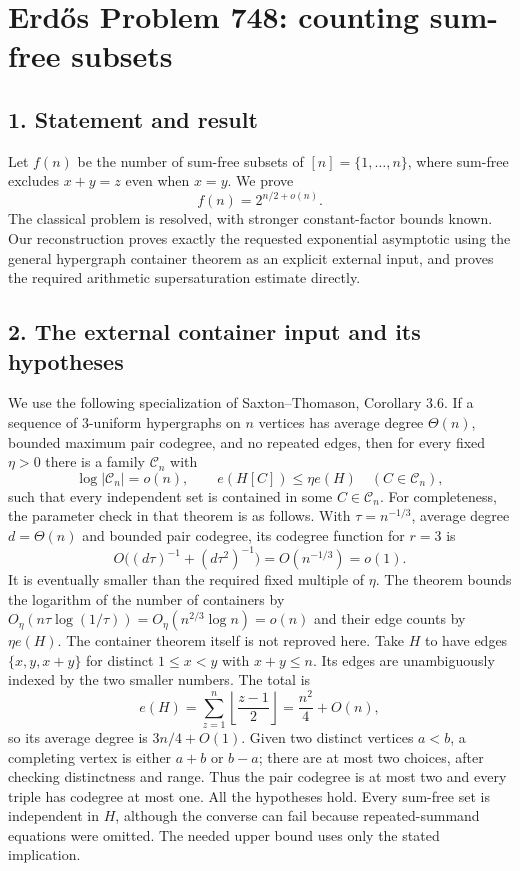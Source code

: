 \section*{Erd\H{o}s Problem 748: counting sum-free subsets}
\subsection*{1. Statement and result}
Let $f(n)$ be the number of sum-free subsets of $[n]=\{1,\ldots,n\}$, where sum-free excludes $x+y=z$ even when $x=y$. We prove
\[
 f(n)=2^{n/2+o(n)}.
\]
The classical problem is resolved, with stronger constant-factor bounds known. Our reconstruction proves exactly the requested exponential asymptotic using the general hypergraph container theorem as an explicit external input, and proves the required arithmetic supersaturation estimate directly.
\subsection*{2. The external container input and its hypotheses}
We use the following specialization of Saxton--Thomason, Corollary 3.6. If a sequence of $3$-uniform hypergraphs on $n$ vertices has average degree $\Theta(n)$, bounded maximum pair codegree, and no repeated edges, then for every fixed $\eta>0$ there is a family $\mathcal C_n$ with
\[
 \log|\mathcal C_n|=o(n),\qquad
 e(H[C])\le\eta e(H)\quad(C\in\mathcal C_n),
\]
such that every independent set is contained in some $C\in\mathcal C_n$.
For completeness, the parameter check in that theorem is as follows. With $\tau=n^{-1/3}$, average degree $d=\Theta(n)$ and bounded pair codegree, its codegree function for $r=3$ is
\[
 O\bigl((d\tau)^{-1}+(d\tau^2)^{-1}\bigr)=O(n^{-1/3})=o(1).
\]
It is eventually smaller than the required fixed multiple of $\eta$. The theorem bounds the logarithm of the number of containers by $O_\eta(n\tau\log(1/\tau))=O_\eta(n^{2/3}\log n)=o(n)$ and their edge counts by $\eta e(H)$. The container theorem itself is not reproved here.
Take $H$ to have edges $\{x,y,x+y\}$ for distinct $1\le x<y$ with $x+y\le n$. Its edges are unambiguously indexed by the two smaller numbers. The total is
\[
 e(H)=\sum_{z=1}^n\left\lfloor\frac{z-1}{2}\right\rfloor=\frac{n^2}{4}+O(n),
\]
so its average degree is $3n/4+O(1)$. Given two distinct vertices $a<b$, a completing vertex is either $a+b$ or $b-a$; there are at most two choices, after checking distinctness and range. Thus the pair codegree is at most two and every triple has codegree at most one. All the hypotheses hold. Every sum-free set is independent in $H$, although the converse can fail because repeated-summand equations were omitted. The needed upper bound uses only the stated implication.
